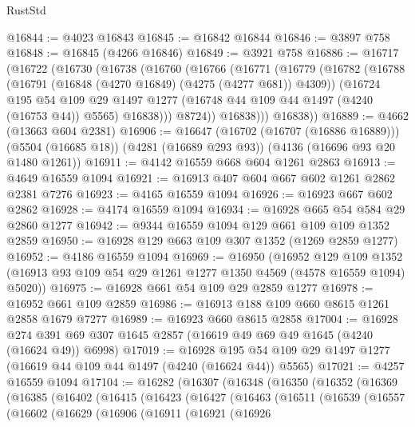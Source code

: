 \begin{lexlean}{RustStd}
\begin{coremodule}
{\begin{coremodule}
{{{{{{{{{{{{{{{{{{{{{{{{{{{{{{{{{{{@16844 := @4023 @16843
@16845 := @16842 @16844
@16846 := @3897 @758
@16848 := @16845 (@4266 @16846)
@16849 := @3921 @758
@16886 := @16717
    (@16722
      (@16730
        (@16738
          (@16760
            (@16766
              (@16771
                (@16779
                  (@16782
                    (@16788
                      (@16791 (@16848 (@4270 @16849) (@4275 (@4277 @681)) @4309))
                      (@16724
                        @195
                        @54
                        @109
                        @29
                        @1497
                        @1277
                        (@16748 @44 @109 @44 @1497 (@4240 (@16753 @44)) @5565)
                        @16838)))
                  @8724))
              @16838)))
        @16838))
@16889 := @4662 (@13663 @604 @2381)
@16906 := @16647
    (@16702 (@16707 (@16886 @16889)))
    (@5504 (@16685 @18))
    (@4281 (@16689 @293 @93))
    (@4136 (@16696 @93 @20 @1480 @1261))
@16911 := @4142 @16559 @668 @604 @1261 @2863
@16913 := @4649 @16559 @1094
@16921 := @16913 @407 @604 @667 @602 @1261 @2862 @2381 @7276
@16923 := @4165 @16559 @1094
@16926 := @16923 @667 @602 @2862
@16928 := @4174 @16559 @1094
@16934 := @16928 @665 @54 @584 @29 @2860 @1277
@16942 := @9344 @16559 @1094 @129 @661 @109 @109 @1352 @2859
@16950 := @16928 @129 @663 @109 @307 @1352 (@1269 @2859 @1277)
@16952 := @4186 @16559 @1094
@16969 := @16950
    (@16952
      @129
      @109
      @1352
      (@16913 @93 @109 @54 @29 @1261 @1277 @1350 @4569 (@4578 @16559 @1094) @5020))
@16975 := @16928 @661 @54 @109 @29 @2859 @1277
@16978 := @16952 @661 @109 @2859
@16986 := @16913 @188 @109 @660 @8615 @1261 @2858 @1679 @7277
@16989 := @16923 @660 @8615 @2858
@17004 := @16928
    @274
    @391
    @69
    @307
    @1645
    @2857
    (@16619 @49 @69 @49 @1645 (@4240 (@16624 @49)) @6998)
@17019 := @16928
    @195
    @54
    @109
    @29
    @1497
    @1277
    (@16619 @44 @109 @44 @1497 (@4240 (@16624 @44)) @5565)
@17021 := @4257 @16559 @1094
@17104 := @16282
    (@16307
      (@16348
        (@16350
          (@16352
            (@16369
              (@16385
                (@16402
                  (@16415
                    (@16423
                      (@16427
                        (@16463
                          (@16511
                            (@16539
                              (@16557
                                (@16602
                                  (@16629
                                    (@16906
                                      (@16911
                                        (@16921
                                          (@16926
}}}}}}}}}}}}}}}}}}}}}}}}}}}}}}}}}}}
\end{coremodule}}
\end{coremodule}
\end{lexlean}
